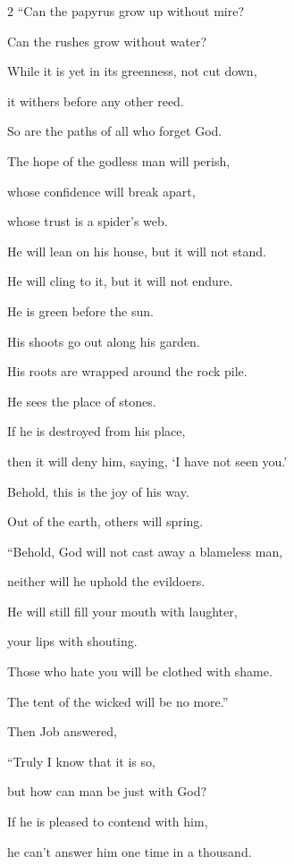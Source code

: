 \begin{multicols}{2}
	\myverse{}“Can the papyrus grow up without mire?
	
	Can the rushes grow without water?
	
	\myverse{}While it is yet in its greenness, not cut down,
	
	it withers before any other reed.
	
	\myverse{}So are the paths of all who forget God.
	
	The hope of the godless man will perish,
	
	\myverse{}whose confidence will break apart,
	
	whose trust is a spider’s web.
	
	\myverse{}He will lean on his house, but it will not stand.
	
	He will cling to it, but it will not endure.
	
	\myverse{}He is green before the sun.
	
	His shoots go out along his garden.
	
	\myverse{}His roots are wrapped around the rock pile.
	
	He sees the place of stones.
	
	\myverse{}If he is destroyed from his place,
	
	then it will deny him, saying, ‘I have not seen you.’
	
	\myverse{}Behold, this is the joy of his way.
	
	Out of the earth, others will spring.
	
	\vspace{\baselineskip}
	
	\myverse{}“Behold, God will not cast away a blameless man,
	
	neither will he uphold the evildoers.
	
	\myverse{}He will still fill your mouth with laughter,
	
	your lips with shouting.
	
	\myverse{}Those who hate you will be clothed with shame.
	
	The tent of the wicked will be no more.”
	
	
	\mychapter{} \myverse*{}Then Job answered,
	
	\myverse{}“Truly I know that it is so,
	
	but how can man be just with God?
	
	\myverse{}If he is pleased to contend with him,
	
	he can’t answer him one time in a thousand.
	

\end{multicols}

